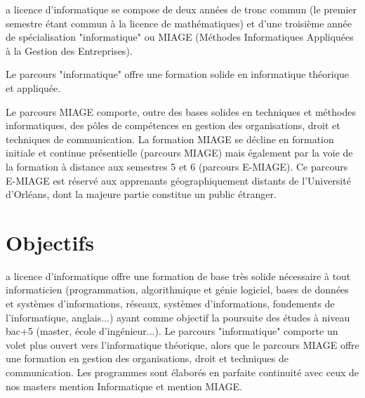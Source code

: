 \documentclass[10pt, a5paper]{report}
\begin{document}
\begin{spacing}{1.5}


a licence d'informatique se compose de deux années de tronc commun (le premier semestre étant commun à la licence de mathématiques) et d'une troisième année de spécialisation "informatique" ou MIAGE (Méthodes Informatiques Appliquées à la Gestion des Entreprises).

Le parcours "informatique" offre une formation solide en informatique théorique et appliquée. 

Le parcours MIAGE comporte, outre des bases solides en techniques et méthodes informatiques, des pôles de compétences en gestion des organisations, droit et techniques de communication. 
La formation MIAGE se décline en formation initiale et continue présentielle (parcours MIAGE) mais également par la voie de la formation à distance aux semestres 5 et 6 (parcours E-MIAGE). Ce parcours E-MIAGE est réservé aux apprenants géographiquement distants de l'Université d'Orléans, dont la majeure partie constitue un public étranger.

\section*{Objectifs} 





a licence d'informatique offre une formation de base très solide nécessaire à tout informaticien (programmation, algorithmique et génie logiciel, bases de données et systèmes d'informations, réseaux, systèmes d'informations, fondements de l'informatique, anglais...) ayant comme objectif la poursuite des études à niveau bac+5 (master, école d'ingénieur...). Le parcours "informatique" comporte un volet plus ouvert vers l'informatique théorique, alors que le parcours MIAGE offre une formation en gestion des organisations, droit et techniques de communication.
Les programmes sont élaborés en parfaite continuité avec ceux de nos masters mention Informatique et mention MIAGE. 


\end{spacing}
\end{document}

